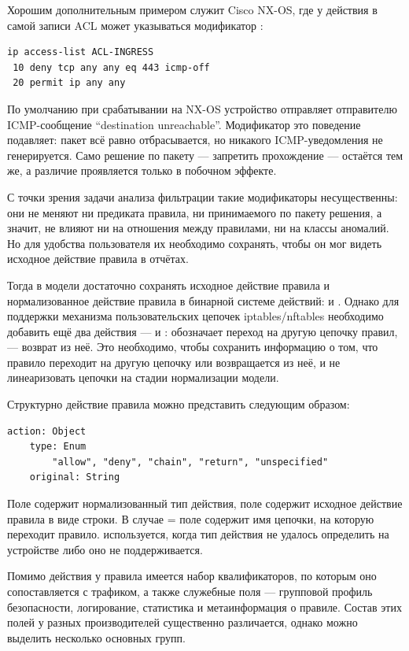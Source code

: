 Хорошим дополнительным примером служит Cisco NX-OS, где у действия  в самой записи ACL может указываться модификатор :

\begin{verbatim}
ip access-list ACL-INGRESS
 10 deny tcp any any eq 443 icmp-off
 20 permit ip any any
\end{verbatim}

По умолчанию при срабатывании  на NX-OS устройство отправляет отправителю ICMP-сообщение ``destination unreachable''. Модификатор  это поведение подавляет: пакет всё равно отбрасывается, но никакого ICMP-уведомления не генерируется. Само решение по пакету --- запретить прохождение --- остаётся тем же, а различие проявляется только в побочном эффекте.

С точки зрения задачи анализа фильтрации такие модификаторы несущественны: они не меняют ни предиката правила, ни принимаемого по пакету решения, а значит, не влияют ни на отношения между правилами, ни на классы аномалий. Но для удобства пользователя их необходимо сохранять, чтобы он мог видеть исходное действие правила в отчётах.

Тогда в модели достаточно сохранять исходное действие правила и нормализованное действие правила в бинарной системе действий:  и . Однако для поддержки механизма пользовательских цепочек iptables/nftables необходимо добавить ещё два действия ---  и :  обозначает переход на другую цепочку правил,  --- возврат из неё. Это необходимо, чтобы сохранить информацию о том, что правило переходит на другую цепочку или возвращается из неё, и не линеаризовать цепочки на стадии нормализации модели.

Структурно действие правила можно представить следующим образом:
\begin{lstlisting}[style=schemastyle]
action: Object
    type: Enum
        "allow", "deny", "chain", "return", "unspecified"
    original: String
\end{lstlisting}

Поле  содержит нормализованный тип действия, поле  содержит исходное действие правила в виде строки. В случае  =  поле  содержит имя цепочки, на которую переходит правило.  используется, когда тип действия не удалось определить на устройстве либо оно не поддерживается.

Помимо действия у правила имеется набор квалификаторов, по которым оно сопоставляется с трафиком, а также служебные поля --- групповой профиль безопасности, логирование, статистика и метаинформация о правиле. Состав этих полей у разных производителей существенно различается, однако можно выделить несколько основных групп.

